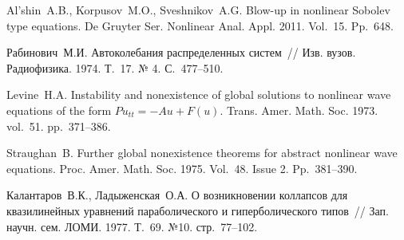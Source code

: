 \begin{thebibliography}{9} %
  Al'shin~A.B., Korpusov~M.O.,  Sveshnikov~A.G. Blow-up in nonlinear Sobolev type equations. De Gruyter Ser. Nonlinear Anal. Appl. 2011. Vol.~15. Pp.~648.

  Рабинович~М.И. Автоколебания распределенных систем~// Изв. вузов. Радиофизика. 1974. Т.~17. № 4. С.~477--510.		

   Levine~H.A. Instability and nonexistence of global solutions to nonlinear wave equations of the form $Pu_{tt}=-Au+F(u)$. Trans. Amer. Math. Soc. 1973. vol.~51. pp.~371--386.

 Straughan~B. Further global nonexistence theorems for abstract nonlinear wave equations. Proc. Amer. Math. Soc. 1975. Vol.~48. Issue 2. Pp.~381--390.

 Калантаров~В.К., Ладыженская~О.А. О возникновении коллапсов для квазилинейных уравнений параболического и гиперболического типов~// Зап. научн. сем. ЛОМИ. 1977. Т.~69. №10. стр.~77--102.


%
%
%
%

\end{thebibliography}





%

